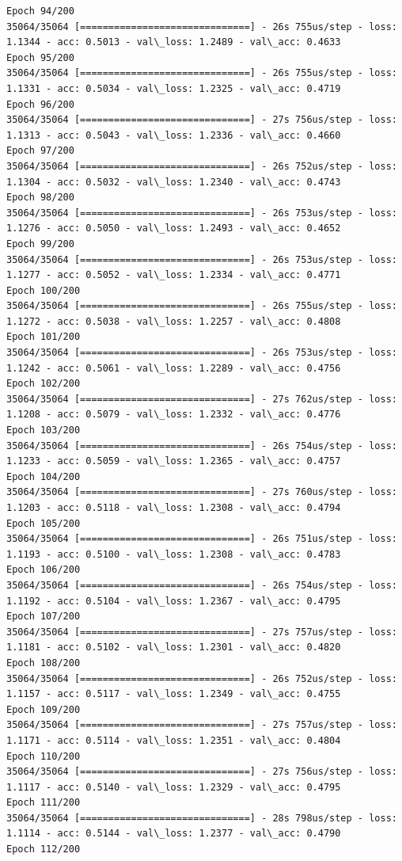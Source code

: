 \documentclass[11pt]{article}
\begin{document}
\begin{Verbatim}[commandchars=\\\{\}]
Epoch 94/200
35064/35064 [==============================] - 26s 755us/step - loss: 1.1344 - acc: 0.5013 - val\_loss: 1.2489 - val\_acc: 0.4633
Epoch 95/200
35064/35064 [==============================] - 26s 755us/step - loss: 1.1331 - acc: 0.5034 - val\_loss: 1.2325 - val\_acc: 0.4719
Epoch 96/200
35064/35064 [==============================] - 27s 756us/step - loss: 1.1313 - acc: 0.5043 - val\_loss: 1.2336 - val\_acc: 0.4660
Epoch 97/200
35064/35064 [==============================] - 26s 752us/step - loss: 1.1304 - acc: 0.5032 - val\_loss: 1.2340 - val\_acc: 0.4743
Epoch 98/200
35064/35064 [==============================] - 26s 753us/step - loss: 1.1276 - acc: 0.5050 - val\_loss: 1.2493 - val\_acc: 0.4652
Epoch 99/200
35064/35064 [==============================] - 26s 753us/step - loss: 1.1277 - acc: 0.5052 - val\_loss: 1.2334 - val\_acc: 0.4771
Epoch 100/200
35064/35064 [==============================] - 26s 755us/step - loss: 1.1272 - acc: 0.5038 - val\_loss: 1.2257 - val\_acc: 0.4808
Epoch 101/200
35064/35064 [==============================] - 26s 753us/step - loss: 1.1242 - acc: 0.5061 - val\_loss: 1.2289 - val\_acc: 0.4756
Epoch 102/200
35064/35064 [==============================] - 27s 762us/step - loss: 1.1208 - acc: 0.5079 - val\_loss: 1.2332 - val\_acc: 0.4776
Epoch 103/200
35064/35064 [==============================] - 26s 754us/step - loss: 1.1233 - acc: 0.5059 - val\_loss: 1.2365 - val\_acc: 0.4757
Epoch 104/200
35064/35064 [==============================] - 27s 760us/step - loss: 1.1203 - acc: 0.5118 - val\_loss: 1.2308 - val\_acc: 0.4794
Epoch 105/200
35064/35064 [==============================] - 26s 751us/step - loss: 1.1193 - acc: 0.5100 - val\_loss: 1.2308 - val\_acc: 0.4783
Epoch 106/200
35064/35064 [==============================] - 26s 754us/step - loss: 1.1192 - acc: 0.5104 - val\_loss: 1.2367 - val\_acc: 0.4795
Epoch 107/200
35064/35064 [==============================] - 27s 757us/step - loss: 1.1181 - acc: 0.5102 - val\_loss: 1.2301 - val\_acc: 0.4820
Epoch 108/200
35064/35064 [==============================] - 26s 752us/step - loss: 1.1157 - acc: 0.5117 - val\_loss: 1.2349 - val\_acc: 0.4755
Epoch 109/200
35064/35064 [==============================] - 27s 757us/step - loss: 1.1171 - acc: 0.5114 - val\_loss: 1.2351 - val\_acc: 0.4804
Epoch 110/200
35064/35064 [==============================] - 27s 756us/step - loss: 1.1117 - acc: 0.5140 - val\_loss: 1.2329 - val\_acc: 0.4795
Epoch 111/200
35064/35064 [==============================] - 28s 798us/step - loss: 1.1114 - acc: 0.5144 - val\_loss: 1.2377 - val\_acc: 0.4790
Epoch 112/200

\end{Verbatim}
\end{document}

